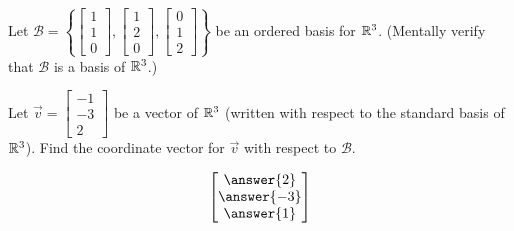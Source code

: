\documentclass{ximera}
\begin{document}
\begin{exercise}
Let $\mathcal{B}=\left\{ \begin{bmatrix}1\\1\\0\end{bmatrix}, \begin{bmatrix}1\\2\\0\end{bmatrix}, \begin{bmatrix}0\\1\\2\end{bmatrix}\right\}$ be an ordered basis for $\mathbb{R}^3$.  (Mentally verify that $\mathcal{B}$ is a basis of $\mathbb{R}^3$.)
 
Let $\vec{v}=\begin{bmatrix}-1\\-3\\2\end{bmatrix}$ be a vector of $\mathbb{R}^3$ (written with respect to the standard basis of $\mathbb{R}^3$).
Find the coordinate vector for $\vec{v}$ with respect to $\mathcal{B}$.
 
$$\begin{bmatrix}\answer{2}\\\answer{-3}\\\answer{1}\end{bmatrix}$$
\end{exercise}
\end{document}
